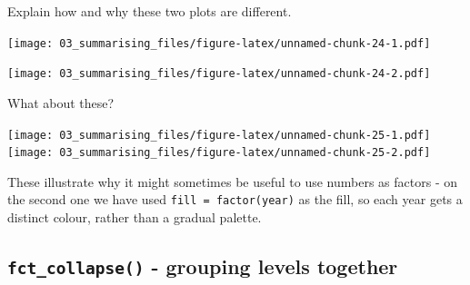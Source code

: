 \documentclass[12pt,]{krantz}
\makeatletter
\newenvironment{Shaded}{\begin{snugshade}}{\end{snugshade}}
\newcommand{\DataTypeTok}[1]{\textcolor[rgb]{0.13,0.29,0.53}{#1}}
\newcommand{\KeywordTok}[1]{\textcolor[rgb]{0.13,0.29,0.53}{\textbf{#1}}}
\newcommand{\NormalTok}[1]{#1}
\newcommand{\OperatorTok}[1]{\textcolor[rgb]{0.81,0.36,0.00}{\textbf{#1}}}
\newcommand{\StringTok}[1]{\textcolor[rgb]{0.31,0.60,0.02}{#1}}
\newenvironment{kframe}{%
\medskip{}
\setlength{\fboxsep}{.8em}
 \def\at@end@of@kframe{}%
 \ifinner\ifhmode%
  \def\at@end@of@kframe{\end{minipage}}%
  \begin{minipage}{\columnwidth}%
 \fi\fi%
 \def\FrameCommand##1{\hskip\@totalleftmargin \hskip-\fboxsep
 \colorbox{shadecolor}{##1}\hskip-\fboxsep
     \hskip-\linewidth \hskip-\@totalleftmargin \hskip\columnwidth}%
 \MakeFramed {\advance\hsize-\width
   \@totalleftmargin\z@ \linewidth\hsize
   \@setminipage}}%
 {\par\unskip\endMakeFramed%
 \at@end@of@kframe}
\renewenvironment{Shaded}{\begin{kframe}}{\end{kframe}}
\theoremstyle{definition}
\theoremstyle{definition}
\theoremstyle{definition}
\theoremstyle{remark}
\makeatother
\begin{document}
Explain how and why these two plots are different.

\begin{Shaded}
\end{Shaded}

\texttt{[image: 03\_summarising\_files/figure-latex/unnamed-chunk-24-1.pdf]}

\begin{Shaded}
\end{Shaded}

\texttt{[image: 03\_summarising\_files/figure-latex/unnamed-chunk-24-2.pdf]}

What about these?

\texttt{[image: 03\_summarising\_files/figure-latex/unnamed-chunk-25-1.pdf]}
\texttt{[image: 03\_summarising\_files/figure-latex/unnamed-chunk-25-2.pdf]}

These illustrate why it might sometimes be useful to use numbers as
factors - on the second one we have used \texttt{fill\ =\ factor(year)}
as the fill, so each year gets a distinct colour, rather than a gradual
palette.

\hypertarget{fct_collapse---grouping-levels-together}{%
\subsection{\texorpdfstring{\texttt{fct\_collapse()} - grouping levels
together}{fct\_collapse() - grouping levels together}}\label{fct_collapse---grouping-levels-together}}

\begin{Shaded}
\end{Shaded}
\end{document}
